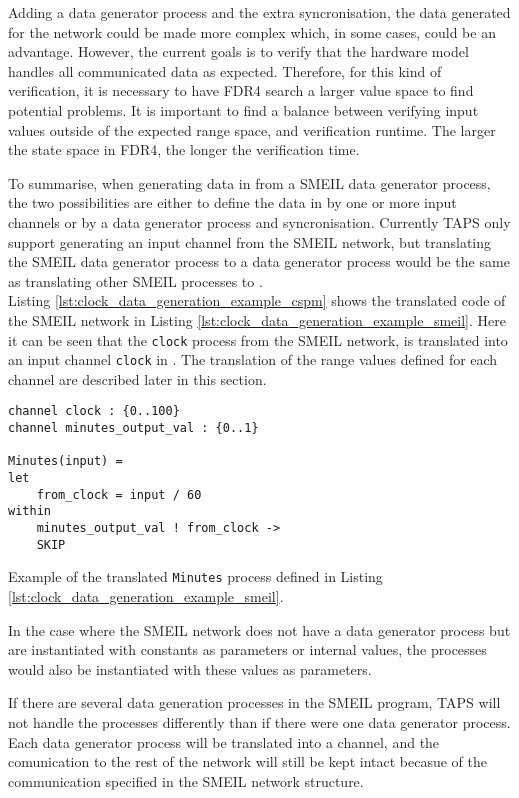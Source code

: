 Adding a data generator process and the extra syncronisation, the data generated for the network could be made more complex which, in some cases, could be an advantage. However, the current goals is to verify that the hardware model handles all communicated data as expected. Therefore, for this kind of verification, it is necessary to have FDR4 search a larger value space to find potential problems. It is important to find a balance between verifying input values outside of the expected range space, and verification runtime. The larger the state space in FDR4, the longer the verification time.

To summarise, when generating data in \cspm{} from a SMEIL data generator process, the two possibilities are either to define the data in \cspm by one or more input channels or by a data generator process and syncronisation.
Currently TAPS only support generating an input channel from the SMEIL network, but translating the SMEIL data generator process to a \cspm{} data generator process would be the same as translating other SMEIL processes to \cspm{}.\\

Listing \ref{lst:clock_data_generation_example_cspm} shows the translated code of the SMEIL network in Listing \ref{lst:clock_data_generation_example_smeil}. Here it can be seen that the \texttt{clock} process from the SMEIL network, is translated into an input channel \texttt{clock} in \cspm{}. The translation of the range values defined for each channel are described later in this section.
\begin{listing}
\begin{verbatim}
channel clock : {0..100}
channel minutes_output_val : {0..1}

Minutes(input) =
let
    from_clock = input / 60
within
    minutes_output_val ! from_clock ->
    SKIP

\end{verbatim}
\caption{Example of the translated \texttt{Minutes} process defined in Listing \ref{lst:clock_data_generation_example_smeil}.}
\label{lst:clock_data_generation_example_cspm}
\end{listing}
In the case where the SMEIL network does not have a data generator process but are instantiated with constants as parameters or internal values, the \cspm{} processes would also be instantiated with these values as parameters.

If there are several data generation processes in the SMEIL program, TAPS will not handle the processes differently than if there were one data generator process. Each data generator process will be translated into a \cspm channel, and the comunication to the rest of the network will still be kept intact becasue of the communication specified in the SMEIL network structure.


